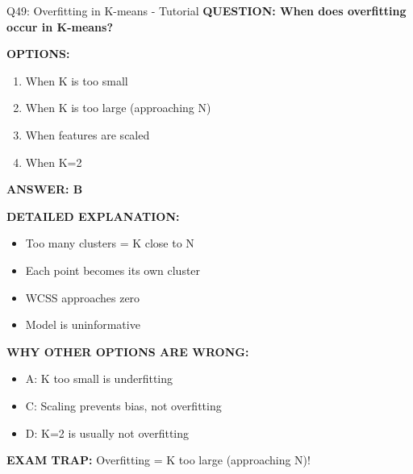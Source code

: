 \documentclass[8pt]{beamer}
\begin{document}
	\begin{frame}{Q49: Overfitting in K-means - Tutorial}
		\fontsize{6.5}{7.5}\selectfont
		\textbf{QUESTION: When does overfitting occur in K-means?}
		
		\vspace{0.1cm}
		\textbf{OPTIONS:}
		\begin{enumerate}
			\item When K is too small
			\item When K is too large (approaching N)
			\item When features are scaled
			\item When K=2
		\end{enumerate}
		
		\vspace{0.1cm}
		\textcolor{myblue}{\textbf{ANSWER: B}}
		
		\vspace{0.1cm}
		\textbf{DETAILED EXPLANATION:}
		\begin{itemize}
			\item Too many clusters = K close to N
			\item Each point becomes its own cluster
			\item WCSS approaches zero
			\item Model is uninformative
		\end{itemize}
		
		\vspace{0.1cm}
		\textcolor{myred}{\textbf{WHY OTHER OPTIONS ARE WRONG:}}
		\begin{itemize}
			\item \textcolor{myred}{A:} K too small is underfitting
			\item \textcolor{myred}{C:} Scaling prevents bias, not overfitting
			\item \textcolor{myred}{D:} K=2 is usually not overfitting
		\end{itemize}
		
		\textcolor{myred}{\textbf{EXAM TRAP:}} Overfitting = \textcolor{myblue}{K too large} (approaching N)!
	\end{frame}
	
\end{document}
